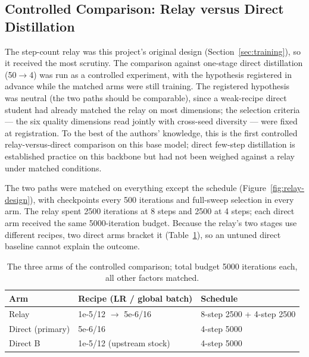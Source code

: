 \documentclass[11pt,a4paper]{article}
\begin{document}
\subsection{Controlled Comparison: Relay versus Direct Distillation}\label{sec:exp-relay}

The step-count relay was this project's original design (Section~\ref{sec:training}), so it received the most scrutiny. The comparison against one-stage direct distillation (50$\to$4) was run as a controlled experiment, with the hypothesis registered in advance while the matched arms were still training. The registered hypothesis was neutral (the two paths should be comparable), since a weak-recipe direct student had already matched the relay on most dimensions; the selection criteria — the six quality dimensions read jointly with cross-seed diversity — were fixed at registration. To the best of the authors' knowledge, this is the first controlled relay-versus-direct comparison on this base model; direct few-step distillation is established practice on this backbone \cite{fastwan,codmd} but had not been weighed against a relay under matched conditions.

The two paths were matched on everything except the schedule (Figure~\ref{fig:relay-design}), with checkpoints every 500 iterations and full-sweep selection in every arm. The relay spent 2500 iterations at 8 steps and 2500 at 4 steps; each direct arm received the same 5000-iteration budget. Because the relay's two stages use different recipes, two direct arms bracket it (Table~\ref{tab:setup}), so an untuned direct baseline cannot explain the outcome.

\begin{table}[htbp]
  \centering
  \begin{tabular}{lll}
    \toprule
    Arm & Recipe (LR / global batch) & Schedule \\
    \midrule
    Relay & 1e-5/12 $\to$ 5e-6/16 & 8-step 2500 + 4-step 2500 \\
    Direct (primary) & 5e-6/16 & 4-step 5000 \\
    Direct B & 1e-5/12 (upstream stock) & 4-step 5000 \\
    \bottomrule
  \end{tabular}
  \caption{The three arms of the controlled comparison; total budget 5000 iterations each, all other factors matched.}
  \label{tab:setup}
\end{table}
\end{document}
